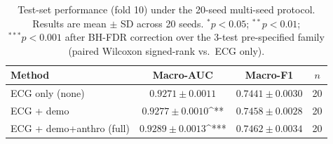 \begin{table}[htbp]
\centering
\caption{Test-set performance (fold 10) under the 20-seed multi-seed protocol.
Results are mean $\pm$ SD across 20 seeds.
$^{*}p < 0.05$; $^{**}p < 0.01$; $^{***}p < 0.001$ after BH-FDR correction
over the 3-test pre-specified family (paired Wilcoxon signed-rank vs.\ ECG only).}
\label{tab:results_multiseed}
\begin{tabular}{lccc}
\toprule
\textbf{Method} & \textbf{Macro-AUC} & \textbf{Macro-F1} & \textbf{$n$} \\
\midrule
ECG only (none) & $0.9271 \pm 0.0011$ & $0.7441 \pm 0.0030$ & 20 \\
ECG + demo & $0.9277 \pm 0.0010$^{**} & $0.7458 \pm 0.0028$ & 20 \\
ECG + demo+anthro (full) & $0.9289 \pm 0.0013$^{***} & $0.7462 \pm 0.0034$ & 20 \\
\bottomrule
\end{tabular}
\end{table}
